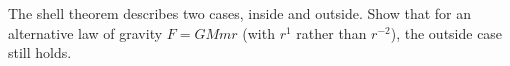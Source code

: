 The shell theorem describes two cases, inside and outside.
Show that for an alternative law of gravity $F=GMmr$ (with $r^1$
rather than $r^{-2}$), the outside case still holds.
